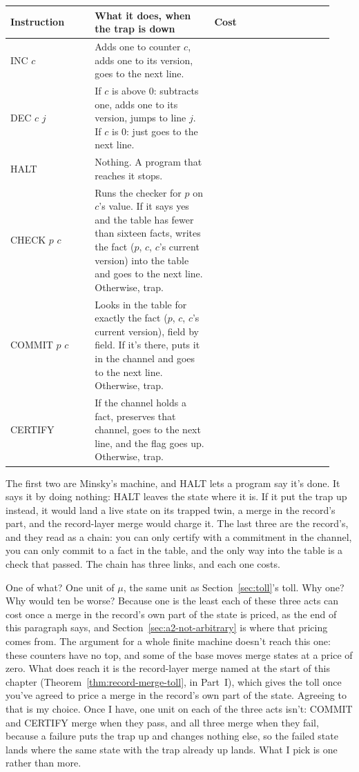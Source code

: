 \documentclass[11pt,twoside]{article}
\theoremstyle{thielethm}
\theoremstyle{thieledef}
\theoremstyle{thieledef}
\theoremstyle{thieledef}
\theoremstyle{thielethm}
\theoremstyle{thieleobs}
\theoremstyle{thielethm}
\begin{document}
\begingroup\small
\begin{longtable}{@{}>{\raggedright\arraybackslash}p{0.242\linewidth}>{\raggedright\arraybackslash}p{0.344\linewidth}>{\raggedright\arraybackslash}p{0.344\linewidth}@{}}
\toprule
\textbf{Instruction} & \textbf{What it does, when the trap is down} & \textbf{Cost} \\
\midrule
\endhead
\bottomrule
\endlastfoot
INC $c$ & Adds one to counter $c$, adds one to its version, goes to the next line. & 0 \\
DEC $c$ $j$ & If $c$ is above 0: subtracts one, adds one to its version, jumps to line $j$. If $c$ is 0: just goes to the next line. & 0 \\
HALT & Nothing. A program that reaches it stops. & 0 \\
CHECK $p$ $c$ & Runs the checker for $p$ on $c$'s value. If it says yes and the table has fewer than sixteen facts, writes the fact ($p$, $c$, $c$'s current version) into the table and goes to the next line. Otherwise, trap. & 1 \\
COMMIT $p$ $c$ & Looks in the table for exactly the fact ($p$, $c$, $c$'s current version), field by field. If it's there, puts it in the channel and goes to the next line. Otherwise, trap. & 1 \\
CERTIFY & If the channel holds a fact, preserves that channel, goes to the next line, and the flag goes up. Otherwise, trap. & 1 \\
\end{longtable}
\endgroup

The first two are Minsky's machine, and HALT lets a program say it's done. It says it by doing nothing: HALT leaves the state where it is. If it put the trap up instead, it would land a live state on its trapped twin, a merge in the record's part, and the record-layer merge would charge it. The last
three are the record's, and they read as a chain: you can only certify with a commitment in the
channel, you can only commit to a fact in the table, and the only way into the table is a
check that passed. The chain has three links, and each one costs.

One of what? One unit of $\mu$, the same unit as Section~\ref{sec:toll}'s toll. Why one? Why would ten be worse? Because one is the least each of these three acts can cost once a merge in the record's own part of the state is priced, as the end of this paragraph says, and Section~\ref{sec:a2-not-arbitrary} is where that pricing comes from. The argument for a whole finite machine doesn't reach this one: these counters have no top,
and some of the base moves merge states at a price of zero. What does reach it is the
record-layer merge named at the start of this chapter (Theorem~\ref{thm:record-merge-toll}, in Part~I), which
gives the toll once you've agreed to price a merge in the record's own part of the state. Agreeing to that is my choice. Once I have, one unit on each of the three acts isn't: COMMIT and CERTIFY merge when they pass, and all three merge when they fail, because a failure puts the trap up and changes nothing else, so the failed state lands where the same state with the trap already up lands. What I pick is one rather than more.
\end{document}
